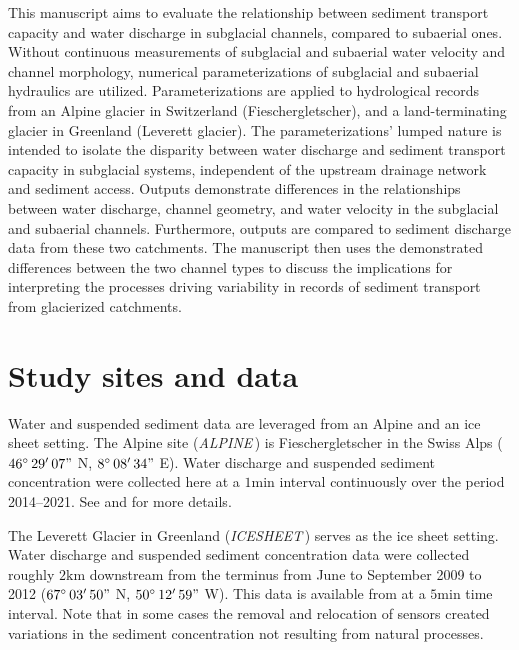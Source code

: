 \documentclass[11pt]{article}
\newcommand{\TODO}[1]{\textbf{TODO: \color{red}#1}}
\newcommand{\alpine}{\textit{ALPINE}\,}
\newcommand{\icesheet}{\textit{ICESHEET}\,}
\newcommand{\unit}[1]{$\mathrm{#1}$}
\begin{document}
This manuscript aims to evaluate the relationship between sediment transport capacity and water discharge in subglacial channels, compared to subaerial ones.
Without continuous measurements of subglacial and subaerial water velocity and channel morphology, numerical parameterizations of subglacial and subaerial hydraulics are utilized.
Parameterizations are applied to hydrological records from an Alpine glacier in Switzerland (Fieschergletscher), and  a land-terminating glacier in Greenland (Leverett glacier).
The parameterizations' lumped nature is intended to isolate the disparity between water discharge and sediment transport capacity in subglacial systems, independent of the upstream drainage network and sediment access.
Outputs demonstrate differences in the relationships between  water discharge, channel geometry, and water velocity in the subglacial and subaerial channels. 
Furthermore, outputs are compared to sediment discharge data from these two catchments.
The manuscript then uses the demonstrated differences between the two channel types to discuss the implications for interpreting the processes driving variability in records of sediment transport from glacierized catchments.

\section{Study sites and data}
\label{sect:ss_data}


Water and suspended sediment data are leveraged from an Alpine and an ice sheet setting.
The Alpine site (\alpine) is  Fieschergletscher in the Swiss Alps ($46^\circ\,29'\,07"$ N, $8^\circ\,08'\,34"$ E).
Water discharge and suspended sediment concentration were collected here at a $1$\unit{min} interval continuously over the period 2014--2021. 
See \citet{felix2022} and \citet{felix2021} for more details.

The Leverett Glacier in Greenland (\icesheet) serves as the ice sheet setting.
Water discharge and suspended sediment concentration data were collected roughly $2$\unit{km} downstream from the terminus from June to September 2009 to 2012 ($67^\circ\,03'\,50"$ N, $50^\circ\,12'\,59"$ W).
This data is available from \citet{tedstone2017} at a $5$\unit{min} time interval.
Note that in some cases the removal and relocation of sensors created variations in the sediment concentration not resulting from natural processes.
\end{document}
